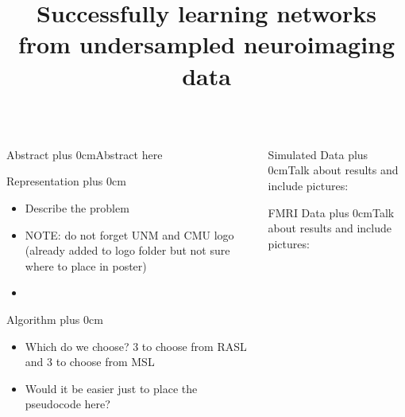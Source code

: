 \documentclass[final,hyperref={pdfpagelabels=false}]{beamer}
\title[Fancy  Posters]{Successfully learning networks from undersampled neuroimaging data}  \author[Plis et
\renewcommand{\raggedright}{\leftskip=0.5cm \rightskip=0.5cm plus 0cm}
\begin{document}
  \begin{frame}{} 
    \begin{columns}[t]
      \begin{column}{.48\linewidth}
        \begin{block}{\Large Abstract}
          \raggedright Abstract here
        \end{block}
        \begin{block}{\Large Representation}
          \raggedright 
          \begin{itemize}
          \item  Describe the problem
          \item  NOTE: do not forget UNM and CMU logo (already added to logo folder but not sure where to place in poster)
          \item 
          \end{itemize}
        \end{block}
        \begin{block}{\Large Algorithm}
          \raggedright  
          \begin{itemize}
          \item Which do we choose? 3 to choose from RASL and 3 to choose from MSL
          \item Would it be easier just to place the pseudocode here?
          \end{itemize}
        \end{block}
  

      \end{column}
      \begin{column}{.48\linewidth}
        \begin{block}{\Large Simulated Data}
          \raggedright Talk about results and include pictures: \vskip5cm
          \vskip5.5cm
        \end{block}
        
        \begin{block}{\Large FMRI Data}
          \raggedright Talk about results and include pictures: \vskip5cm
          \vskip5.5cm
        \end{block}


\end{column}
\end{columns}
\end{frame}
\end{document}
